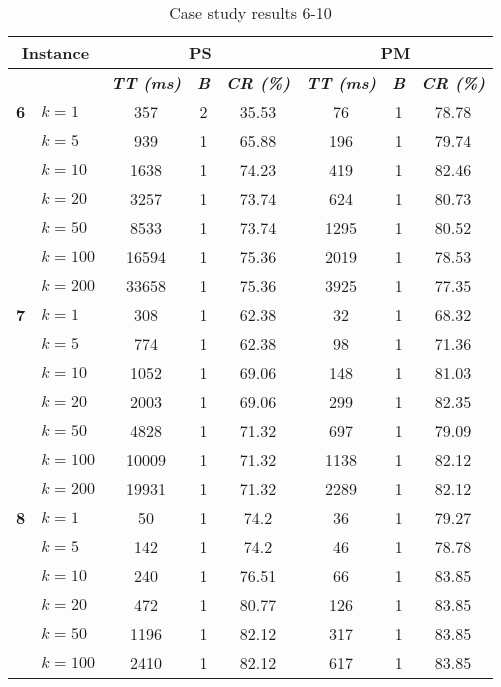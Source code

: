     \begin{table}[htbp]
    \caption{Case study results 6-10}
    \centering
    \begin{tabular}{|l|l|c|c|c|c|c|c|}
    \hline
    \multicolumn{ 2}{|c|}{\textbf{Instance}} & \multicolumn{ 3}{c|}{\textbf{PS}} & \multicolumn{ 3}{c|}{\textbf{PM}} \\ \hline
    \multicolumn{ 2}{|l|}{} & \textbf{\textit{TT (ms)}} & \textbf{\textit{B}} & \textbf{\textit{CR (\%)}} & \textbf{\textit{TT (ms)}} & \textbf{\textit{B}} & \textbf{\textit{CR (\%)}} \\ \hline
    \multicolumn{1}{|r|}{\textbf{6}} & $k=1$ & 357 & 2 & 35.53 & 76 & 1 & 78.78 \\ 
     & $k=5$ & 939 & 1 & 65.88 & 196 & 1 & 79.74 \\ 
     & $k=10$ & 1638 & 1 & 74.23 & 419 & 1 & 82.46 \\ 
     & $k=20$ & 3257 & 1 & 73.74 & 624 & 1 & 80.73 \\ 
     & $k=50$ & 8533 & 1 & 73.74 & 1295 & 1 & 80.52 \\ 
     & $k=100$ & 16594 & 1 & 75.36 & 2019 & 1 & 78.53 \\ 
     & $k=200$ & 33658 & 1 & 75.36 & 3925 & 1 & 77.35 \\ \hline
    \multicolumn{1}{|r|}{\textbf{7}} & $k=1$ & 308 & 1 & 62.38 & 32 & 1 & 68.32 \\ 
     & $k=5$ & 774 & 1 & 62.38 & 98 & 1 & 71.36 \\ 
     & $k=10$ & 1052 & 1 & 69.06 & 148 & 1 & 81.03 \\ 
     & $k=20$ & 2003 & 1 & 69.06 & 299 & 1 & 82.35 \\ 
     & $k=50$ & 4828 & 1 & 71.32 & 697 & 1 & 79.09 \\ 
     & $k=100$ & 10009 & 1 & 71.32 & 1138 & 1 & 82.12 \\ 
     & $k=200$ & 19931 & 1 & 71.32 & 2289 & 1 & 82.12 \\ \hline
    \multicolumn{1}{|r|}{\textbf{8}} & $k=1$ & 50 & 1 & 74.2 & 36 & 1 & 79.27 \\ 
     & $k=5$ & 142 & 1 & 74.2 & 46 & 1 & 78.78 \\ 
     & $k=10$ & 240 & 1 & 76.51 & 66 & 1 & 83.85 \\ 
     & $k=20$ & 472 & 1 & 80.77 & 126 & 1 & 83.85 \\ 
     & $k=50$ & 1196 & 1 & 82.12 & 317 & 1 & 83.85 \\ 
     & $k=100$ & 2410 & 1 & 82.12 & 617 & 1 & 83.85 \\ 

\end{tabular}
\end{table}
